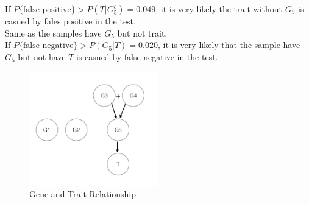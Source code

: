 \documentclass{article}
\begin{document}
\begin{enumerate}
\begin{enumerate}
		If ${P\{\text{false positive}\} > P{(T|G_5^c)}=0.049}$, it is very likely the trait without ${G_5}$ is casued by fales positive in the test.\\
		Same as the samples have ${G_5}$ but not trait.\\
		If ${P\{\text{false negative}\}>P(G_5|T)=0.020}$, it is very likely that the sample have ${G_5}$ but not have ${T}$ is casued by false negative in the test.\\
				\begin{figure}[H]
			\caption{Gene and Trait Relationship}
			\centering
			\includegraphics[width=0.5\textwidth]{GT.jpg}
		\end{figure}
		
		

	\end{enumerate}





\end{enumerate}

\newpage
\end{document}
